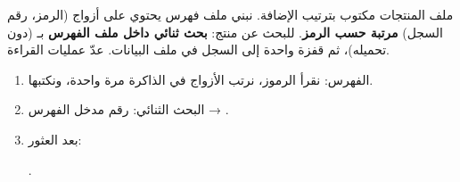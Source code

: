 \begin{statement}
ملف المنتجات  مكتوب بترتيب الإضافة. نبني ملف فهرس  يحتوي على أزواج (الرمز، رقم السجل) \textbf{مرتبة حسب الرمز}. للبحث عن منتج: \textbf{بحث ثنائي داخل ملف الفهرس} بـ  (دون تحميله)، ثم قفزة واحدة إلى السجل في ملف البيانات. عدّ عمليات القراءة.
\end{statement}
\begin{stepsbox}\begin{enumerate}
\item الفهرس: نقرأ الرموز، نرتب الأزواج في الذاكرة مرة واحدة، ونكتبها.
\item البحث الثنائي:  رقم مدخل الفهرس → .
\item بعد العثور: \par{\centering\small{}\par}.
\end{enumerate}\end{stepsbox}
